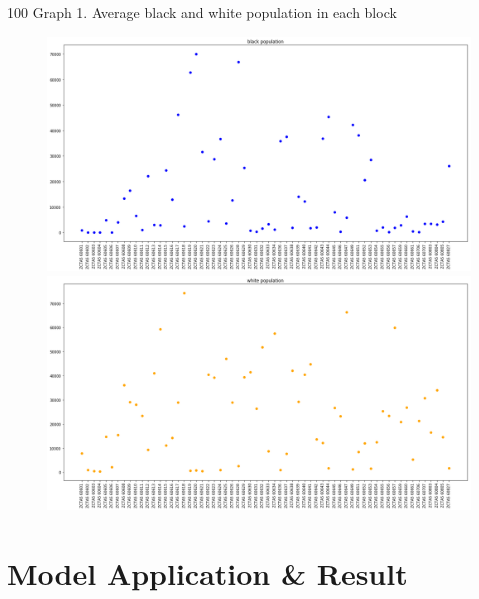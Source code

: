 \documentclass{article}
\begin{document}
\clearpage
\centerline{{\color{white} 100} Graph 1. Average black and white population in each block}
\begin{figure}[!h] 
\centering 
\includegraphics[width=1.2\textwidth]{graph1.png} 
\includegraphics[width=1.2\textwidth]{graph2.png} 
\end{figure}
\section{Model Application \& Result}
\end{document}
